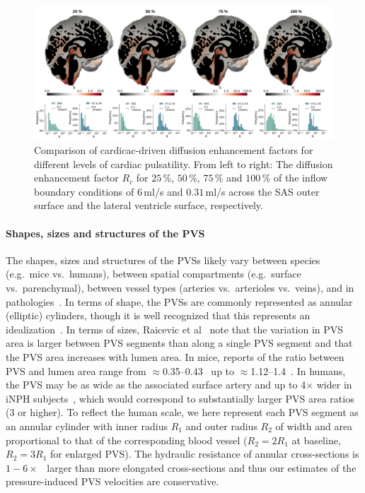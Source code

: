 \documentclass[fleqn,10pt]{wlscirep}
\begin{document}
\begin{figure}
    \centering
    \includegraphics[width=1.0\linewidth]{figures/cardiac_R_comparison.png}
    \caption{Comparison of cardicac-driven diffusion enhancement factors for different levels of cardiac pulsatility. From left to right: The diffusion enhancement factor $R_c$ for $25\,\%$, $50\,\%$, $75\,\%$ and $100\,\%$ of the inflow boundary conditions of $6\,$ml/s and $0.31\,$ml/s across the SAS outer surface and the lateral ventricle surface, respectively.}
    \label{fig:R_comparison}
\end{figure}

\paragraph{Shapes, sizes and structures of the PVS}
The shapes, sizes and structures of the PVSs likely vary between
species (e.g.~mice vs.~humans), between spatial compartments
(e.g.~surface vs.~parenchymal), between vessel types (arteries
vs.~arterioles vs.~veins), and in
pathologies~\cite{ichimura1991distribution, foley2012realtime,
  schain2017cortical, mestre2018flow, bedussi2018paravascular,
  mestre2022periarteriolar, smets2024perivascular, raicevic2023sizes,
  vinje2021brain, eide2024functional}. In terms of shape, the PVSs are
commonly represented as annular (elliptic) cylinders, though it is
well recognized that this represents an
idealization~\cite{mestre2018flow, tithof2019hydraulic,
  vinje2021brain, raicevic2023sizes, boster2024hydraulic,
  smets2024perivascular}. In terms of sizes, Raicevic et
al~\cite{raicevic2023sizes} note that the variation in PVS area is
larger between PVS segments than along a single PVS segment and that
the PVS area increases with lumen area. In mice, reports of the ratio
between PVS and lumen area range from
$\approx$0.35--0.43~\cite{smets2024perivascular} up to
$\approx$1.12--1.4~\cite{raicevic2023sizes, mestre2018flow}. In
humans, the PVS may be as wide as the associated surface artery and up
to 4$\times$ wider in iNPH subjects~\cite{eide2024functional}, which
would correspond to substantially larger PVS area ratios (3 or
higher). To reflect the human scale, we here represent each PVS
segment as an annular cylinder with inner radius $R_1$ and outer
radius $R_2$ of width and area proportional to that of the
corresponding blood vessel ($R_2 = 2 R_1$ at baseline, $R_2 = 3 R_1$
for enlarged PVS). The hydraulic resistance of annular cross-sections
is $1-6 \times$~\cite{tithof2019hydraulic} larger than more elongated
cross-sections and thus our estimates of the pressure-induced PVS
velocities are conservative.
\end{document}

